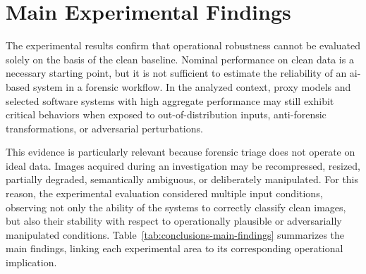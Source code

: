 \section{Main Experimental Findings}
\label{sec:conclusions-findings}

The experimental results confirm that operational robustness cannot be evaluated
solely on the basis of the clean baseline. Nominal performance on clean data is
a necessary starting point, but it is not sufficient to estimate the reliability
of an \gls{ai}-based system in a forensic workflow. In the analyzed context,
proxy models and selected software systems with high aggregate performance may
still exhibit critical behaviors when exposed to out-of-distribution inputs,
anti-forensic transformations, or adversarial perturbations.

This evidence is particularly relevant because forensic triage does not operate
on ideal data. Images acquired during an investigation may be recompressed,
resized, partially degraded, semantically ambiguous, or deliberately
manipulated. For this reason, the experimental evaluation considered multiple
input conditions, observing not only the ability of the systems to correctly
classify clean images, but also their stability with respect to operationally
plausible or adversarially manipulated conditions.
Table~\ref{tab:conclusions-main-findings} summarizes the main findings, linking
each experimental area to its corresponding operational implication.


